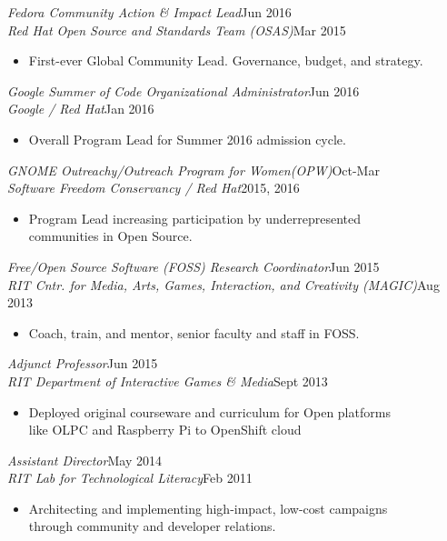 \documentclass[margin]{res}
\newcommand{\wherewhen}[2]{{\sl #1}\hfill #2}
\begin{document}
\begin{resume}
    \wherewhen{Fedora Community Action \& Impact Lead}{Jun 2016}\\
    \wherewhen{Red Hat Open Source and Standards Team (OSAS)}{Mar 2015}
    \begin{itemize}
        \item First-ever Global Community Lead. Governance, budget, and strategy.
    \end{itemize}

    \wherewhen{Google Summer of Code Organizational Administrator}{Jun 2016}\\
    \wherewhen{Google / Red Hat}{Jan 2016}
    \begin{itemize}
        \item Overall Program Lead for Summer 2016 admission cycle.
    \end{itemize}

    \wherewhen{GNOME Outreachy/Outreach Program for Women(OPW)}{Oct-Mar}\\
    \wherewhen{Software Freedom Conservancy / Red Hat}{2015, 2016}
    \begin{itemize}
        \item Program Lead increasing participation by underrepresented \\ 
            communities in Open Source.
    \end{itemize}

    \wherewhen{Free/Open Source Software (FOSS) Research Coordinator}{Jun 2015}\\
    \wherewhen{RIT Cntr. for Media, Arts, Games, Interaction, and Creativity (MAGIC)}{Aug 2013}
    \begin{itemize}
        \item Coach, train, and mentor, senior faculty and staff in FOSS.
    \end{itemize}

    \wherewhen{Adjunct Professor}{Jun 2015}\\
    \wherewhen{RIT Department of Interactive Games \& Media}{Sept 2013}
    \begin{itemize}
        \item Deployed original courseware and curriculum for Open platforms \\
            like OLPC and Raspberry Pi to OpenShift cloud
    \end{itemize}

    \wherewhen{Assistant Director}{May 2014}\\
    \wherewhen{RIT Lab for Technological Literacy}{Feb 2011}
    \begin{itemize}
        \item Architecting and implementing high-impact, low-cost campaigns \\
            through community and developer relations.
    \end{itemize}


\end{resume}
\end{document}
